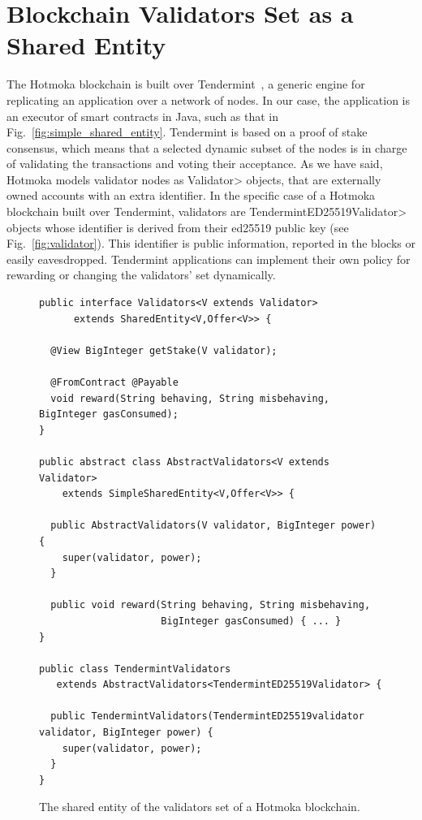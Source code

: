 \section{Blockchain Validators Set as a Shared Entity}\label{sec:validators}

The Hotmoka blockchain is built over Tendermint~\cite{Kwon14}, a
generic engine for replicating an application over a network of nodes. In our case,
the application is an executor of smart contracts in Java, such as that in
Fig.~\ref{fig:simple_shared_entity}. Tendermint is based on a proof of stake
consensus, which means that a selected dynamic subset of the nodes is in charge of
validating the transactions and voting their acceptance. 
As we have said,
Hotmoka models validator nodes as \<Validator> objects, that are externally owned accounts
with an extra identifier. In the specific case of a Hotmoka blockchain built over Tendermint,
validators are \<TendermintED25519Validator> objects whose
identifier is derived from their ed25519 public key (see Fig.~\ref{fig:validator}).
This identifier is public information, reported in the blocks or easily eavesdropped.
Tendermint applications can implement their own
policy for rewarding or changing the validators' set dynamically.



\begin{figure}[t]
  \begin{center}
    \begin{lstlisting}[language=Takamaka]
public interface Validators<V extends Validator>
      extends SharedEntity<V,Offer<V>> {

  @View BigInteger getStake(V validator);

  @FromContract @Payable
  void reward(String behaving, String misbehaving, BigInteger gasConsumed);
}

public abstract class AbstractValidators<V extends Validator>
    extends SimpleSharedEntity<V,Offer<V>> {

  public AbstractValidators(V validator, BigInteger power) {
    super(validator, power);
  }

  public void reward(String behaving, String misbehaving,
                     BigInteger gasConsumed) { ... }
}

public class TendermintValidators
   extends AbstractValidators<TendermintED25519Validator> {

  public TendermintValidators(TendermintED25519validator validator, BigInteger power) {
    super(validator, power);
  }
}
    \end{lstlisting}
  \end{center}
  \caption{The shared entity of the validators set of a Hotmoka blockchain.}\label{fig:validators}
\end{figure}

